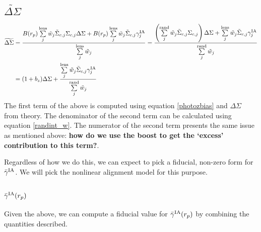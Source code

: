 \documentclass[onecolumn,amsmath,aps,fleqn, superscriptaddress]{revtex4}
\begin{document}
\subsection*{$\widetilde{\Delta \Sigma}$}
\begin{align}
\widetilde{\Delta \Sigma}&= \frac{B(r_p) \sum\limits_{j}^{\rm lens} \tilde{w}_j \tilde{\Sigma}_{c,j} \Sigma_{c,j} \Delta \Sigma + B(r_p) \sum\limits_{j}^{\rm lens} \tilde{w}_j \tilde{\Sigma}_{c,j} \gamma^{\rm IA}_j }{\sum\limits_{j}^{\rm lens} \tilde{w}_j} = \frac{\left(\sum\limits_{j}^{\rm rand} \tilde{w}_j \tilde{\Sigma}_{c,j} \Sigma_{c,j}\right) \Delta \Sigma + \sum\limits_{j}^{\rm lens} \tilde{w}_j \tilde{\Sigma}_{c,j} \gamma^{\rm IA}_j }{\sum\limits_{j}^{\rm rand} \tilde{w}_j} \nonumber \\&= (1+b_z) \Delta \Sigma + \frac{\sum\limits_{j}^{\rm lens} \tilde{w}_j \tilde{\Sigma}_{c,j} \gamma^{\rm IA}_j }{\sum\limits_{j}^{\rm rand} \tilde{w}_j} 
\label{deltasigma}
\end{align}
The first term of the above is computed using equation \ref{photozbias} and $\Delta \Sigma$ from theory. The denominator of the second term can be calculated using equation \ref{randint_w}. The numerator of the second term presents the same issue as mentioned above: {\bf how do we use the boost to get the `excess' contribution to this term?}. 

Regardless of how we do this, we can expect to pick a fiducial, non-zero form for $\bar{\gamma}^{\rm IA}$. We will pick the nonlinear alignment model for this purpose. 

\subsection*{$\bar{\gamma}^{\rm IA}(r_p)$}
Given the above, we can compute a fiducial value for $\bar{\gamma}^{\rm IA}(r_p)$ by combining the quantities described.











\end{document}
